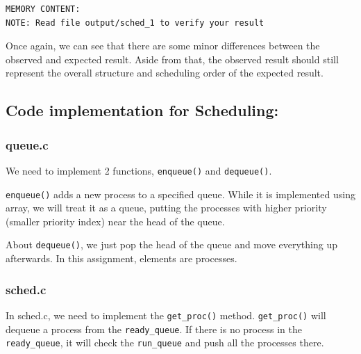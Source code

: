 \documentclass[a4paper]{article}
\numberwithin{equation}{section}
\begin{document}
\begin{mdframed}[leftline=false,rightline=false,backgroundcolor=teal!10,nobreak=false]
\begin{verbatim}
MEMORY CONTENT:
NOTE: Read file output/sched_1 to verify your result
  \end{verbatim}
\end{mdframed}

Once again, we can see that there are some minor differences between the observed and expected result.
Aside from that, the observed result should still represent the overall structure and scheduling order of the expected result.

\subsection{Code implementation for Scheduling:}
\subsubsection{queue.c}
We need to implement 2 functions, \texttt{enqueue()} and \texttt{dequeue()}.

\texttt{enqueue()} adds a new process to a specified queue.
While it is implemented using array, we will treat it as a queue, putting the processes with higher priority (smaller priority index) near the head of the queue.

About \texttt{dequeue()}, we just pop the head of the queue and move everything up afterwards.
In this assignment, elements are processes.

\subsubsection{sched.c}
In sched.c, we need to implement the \texttt{get_proc()} method.
\texttt{get_proc()} will dequeue a process from the \texttt{ready_queue}.
If there is no process in the \texttt{ready_queue}, it will check the \texttt{run_queue} and push all the processes there.
\end{document}

